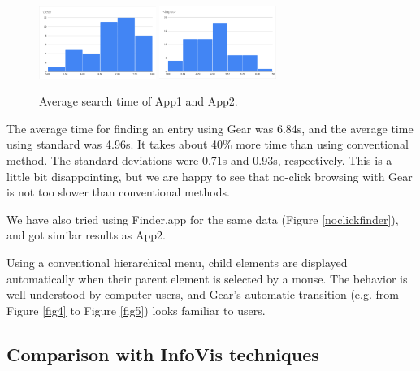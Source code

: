 \documentclass[conference]{IEEEtran}
\begin{document}
\begin{figure}[H]
\centerline{
  \includegraphics[width=38mm,bb=0 0 960 593]{figures/6c39f199b341e30ffc28850afbd90a5a.png}
  \includegraphics[width=38mm,bb=0 0 960 593]{figures/de3f0545e0d0d8dfb9708d2420fb5407.png}
}
\caption{Average search time of App1 and App2.}
\label{monorailtime}
\end{figure}

The average time for finding an entry using Gear was 6.84s,
and the average time using standard  was 4.96s.
It takes about 40\% more time than using conventional method.
The standard deviations were 0.71s and 0.93s, respectively.
%
This is a little bit disappointing,
but we are happy to see that
no-click browsing with Gear is not too slower than
conventional methods.

We have also tried using Finder.app for the same data (Figure \ref{noclickfinder}), and
got similar results as App2.


Using a conventional hierarchical menu,
child elements are displayed automatically when their parent element is selected by a mouse.
The behavior is well understood by computer users,
and Gear's automatic transition (e.g. from Figure \ref{fig4} to Figure \ref{fig5})
looks familiar to users.

\subsection{Comparison with InfoVis techniques}
\end{document}
